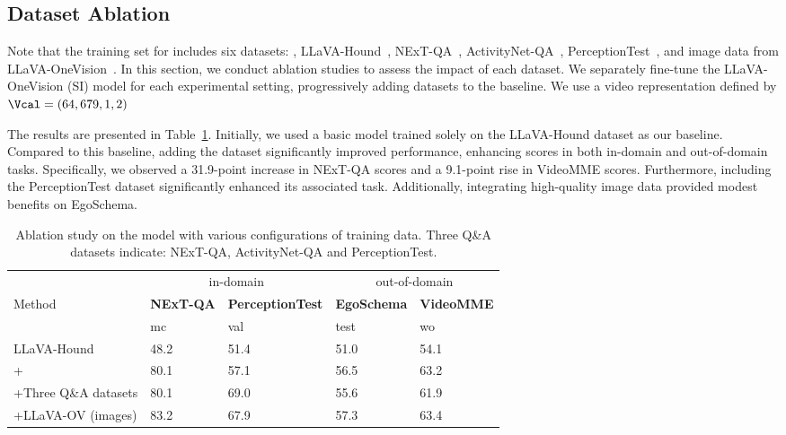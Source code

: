 \subsection{Dataset Ablation}
\label{sec;subsec:dataset_ablation}
Note that the training set for \ModelName{} includes six datasets: \DataName{}, LLaVA-Hound~\citep{zhang2024direct}, NExT-QA~\citep{xiao2021next}, ActivityNet-QA~\citep{yu2019activityqa}, PerceptionTest~\citep{patraucean2023perception}, and image data from LLaVA-OneVision~\citep{li2024llavaonevision}. In this section, we conduct ablation studies to assess the impact of each dataset. We separately fine-tune the LLaVA-OneVision (SI) model for each experimental setting, progressively adding datasets to the baseline. We use a video representation defined by $\Vcal = (64, 679, 1, 2)$

The results are presented in Table~\ref{tab:dataset_ablation}. Initially, we used a basic model trained solely on the LLaVA-Hound dataset as our baseline. Compared to this baseline, adding the \DataName{} dataset significantly improved performance, enhancing scores in both in-domain and out-of-domain tasks. Specifically, we observed a 31.9-point increase in NExT-QA scores and a 9.1-point rise in VideoMME scores. Furthermore, including the PerceptionTest dataset significantly enhanced its associated task. Additionally, integrating high-quality image data provided modest benefits on EgoSchema.

\begin{table}[t!]
\tabstyle{15pt}
\centering
\small
\caption{Ablation study on the \ModelName{} model with various configurations of training data. Three Q\&A datasets indicate: NExT-QA, ActivityNet-QA and PerceptionTest.}
\begin{tabular}{@{}l|llll@{}}
    \toprule
        & \multicolumn{2}{c}{in-domain} & \multicolumn{2}{c}{out-of-domain} \\   

      \multirow{2}{*}{Method}  &
    \textbf{NExT-QA} & \textbf{PerceptionTest} & 
    \textbf{EgoSchema} & 
    \textbf{VideoMME} \\ \cmidrule(l){2-5} 
      &    mc & val  & test & wo \\ \midrule
     LLaVA-Hound  & 48.2 & 51.4 & 51.0 & 54.1 \\
     +\DataName{} & 80.1  & 57.1  & 56.5   & 63.2   \\ 
     
     +Three Q\&A datasets & 80.1 & 69.0   & 55.6  & 61.9   \\

     +LLaVA-OV (images) & 83.2  & 67.9  & 57.3   & 63.4   \\
    \bottomrule
\end{tabular}

\label{tab:dataset_ablation}
\end{table}

